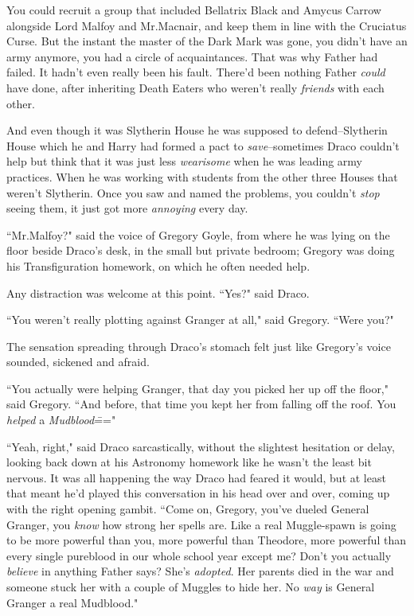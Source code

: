 You could recruit a group that included Bellatrix Black and Amycus Carrow alongside Lord Malfoy and Mr.\?Macnair, and keep them in line with the Cruciatus Curse. But the instant the master of the Dark Mark was gone, you didn't have an army anymore, you had a circle of acquaintances. That was why Father had failed. It hadn't even really been his fault. There'd been nothing Father \emph{could} have done, after inheriting Death Eaters who weren't really \emph{friends} with each other.

And even though it was Slytherin House he was supposed to defend\---Slytherin House which he and Harry had formed a pact to \emph{save}\---sometimes Draco couldn't help but think that it was just less \emph{wearisome} when he was leading army practices. When he was working with students from the other three Houses that weren't Slytherin. Once you saw and named the problems, you couldn't \emph{stop} seeing them, it just got more \emph{annoying} every day.

``Mr.\?Malfoy?" said the voice of Gregory Goyle, from where he was lying on the floor beside Draco's desk, in the small but private bedroom; Gregory was doing his Transfiguration homework, on which he often needed help.

Any distraction was welcome at this point. ``Yes?" said Draco.

``You weren't really plotting against Granger at all," said Gregory. ``Were you?"

The sensation spreading through Draco's stomach felt just like Gregory's voice sounded, sickened and afraid.

``You actually were helping Granger, that day you picked her up off the floor," said Gregory. ``And before, that time you kept her from falling off the roof. You \emph{helped} a \emph{Mudblood}\==="

``Yeah, right," said Draco sarcastically, without the slightest hesitation or delay, looking back down at his Astronomy homework like he wasn't the least bit nervous. It was all happening the way Draco had feared it would, but at least that meant he'd played this conversation in his head over and over, coming up with the right opening gambit. ``Come on, Gregory, you've dueled General Granger, you \emph{know} how strong her spells are. Like a real Muggle-spawn is going to be more powerful than you, more powerful than Theodore, more powerful than every single pureblood in our whole school year except me? Don't you actually \emph{believe} in anything Father says? She's \emph{adopted}. Her parents died in the war and someone stuck her with a couple of Muggles to hide her. No \emph{way} is General Granger a real Mudblood."

